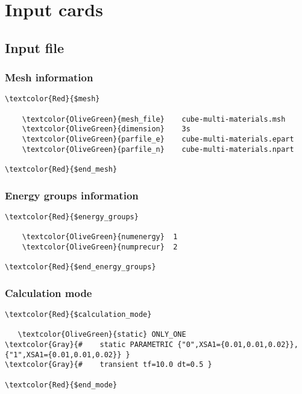 \chapter{Input cards}




\section{Input file}

\subsection{Mesh information}

\begin{Verbatim}[frame=single,commandchars=\\\{\}]
\textcolor{Red}{$mesh}

    \textcolor{OliveGreen}{mesh_file}    cube-multi-materials.msh
    \textcolor{OliveGreen}{dimension}    3s
    \textcolor{OliveGreen}{parfile_e}    cube-multi-materials.epart
    \textcolor{OliveGreen}{parfile_n}    cube-multi-materials.npart

\textcolor{Red}{$end_mesh} 
\end{Verbatim}

\subsection{Energy groups information}

\begin{Verbatim}[frame=single,commandchars=\\\{\}]
\textcolor{Red}{$energy_groups}

    \textcolor{OliveGreen}{numenergy}  1
    \textcolor{OliveGreen}{numprecur}  2
    
\textcolor{Red}{$end_energy_groups}
\end{Verbatim}

\subsection{Calculation mode}

\begin{Verbatim}[frame=single,commandchars=\\\{\}]
\textcolor{Red}{$calculation_mode}

   \textcolor{OliveGreen}{static} ONLY_ONE 
\textcolor{Gray}{#    static PARAMETRIC {"0",XSA1={0.01,0.01,0.02}}, {"1",XSA1={0.01,0.01,0.02}} }
\textcolor{Gray}{#    transient tf=10.0 dt=0.5 }

\textcolor{Red}{$end_mode}
\end{Verbatim}

